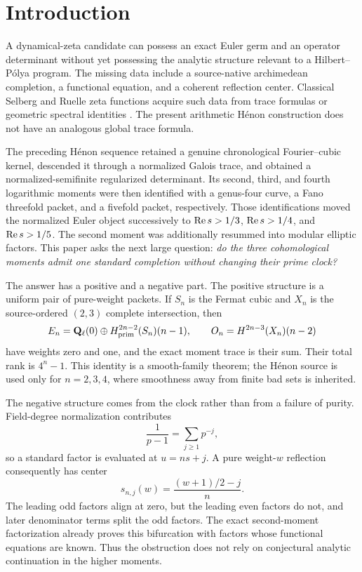\section{Introduction}

A dynamical-zeta candidate can possess an exact Euler germ and an operator
determinant without yet possessing the analytic structure relevant to a
Hilbert--P\'olya program.  The missing data include a source-native
archimedean completion, a functional equation, and a coherent reflection
center.  Classical Selberg and Ruelle zeta functions acquire such data from
trace formulas or geometric spectral identities
\cite{Selberg1956,Ruelle1976}.  The present arithmetic H\'enon construction
does not have an analogous global trace formula.

The preceding H\'enon sequence retained a genuine chronological
Fourier--cubic kernel, descended it through a normalized Galois trace, and
obtained a normalized-semifinite regularized determinant.  Its second,
third, and fourth logarithmic moments were then identified with a
genus-four curve, a Fano threefold packet, and a fivefold packet,
respectively.  Those identifications moved the normalized Euler object
successively to \(\operatorname{Re} s>1/3\), \(\operatorname{Re} s>1/4\), and
\(\operatorname{Re} s>1/5\).  The second moment was additionally resummed into
modular elliptic factors.  This paper asks the next large question:
\emph{do the three cohomological moments admit one standard completion
without changing their prime clock?}

The answer has a positive and a negative part.  The positive structure is a
uniform pair of pure-weight packets.  If \(S_n\) is the Fermat cubic and
\(X_n\) is the source-ordered \((2,3)\) complete intersection, then
\[
 E_n=\mathbf Q_\ell(0)\oplus H^{2n-2}_{\mathrm{prim}}(S_n)(n-1),
 \qquad
 O_n=H^{2n-3}(X_n)(n-2)
\]
have weights zero and one, and the exact moment trace is their sum.
Their total rank is \(4^n-1\).  This identity is a smooth-family theorem;
the H\'enon source is used only for \(n=2,3,4\), where smoothness away
from finite bad sets is inherited.

The negative structure comes from the clock rather than from a failure of
purity.  Field-degree normalization contributes
\[
 \frac1{p-1}=\sum_{j\ge1}p^{-j},
\]
so a standard factor is evaluated at \(u=ns+j\).  A pure weight-\(w\)
reflection consequently has center
\[
 s_{n,j}(w)=\frac{(w+1)/2-j}{n}.
\]
The leading odd factors align at zero, but the leading even factors do not,
and later denominator terms split the odd factors.  The exact
second-moment factorization already proves this bifurcation with factors
whose functional equations are known.  Thus the obstruction does not rely
on conjectural analytic continuation in the higher moments.

